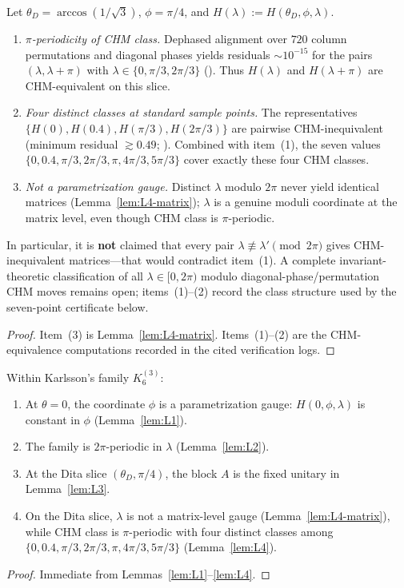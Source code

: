 \begin{lemma}
\label{lem:L4}
\label{lem:dita-chm-pi}
Let $\theta_D=\arccos(1/\sqrt3)$, $\phi=\pi/4$, and $H(\lambda):=H(\theta_D,\phi,\lambda)$.
\begin{enumerate}
    \item \emph{$\pi$-periodicity of CHM class.} Dephased alignment over $720$ column permutations and diagonal phases yields residuals $\sim10^{-15}$ for the pairs $(\lambda,\lambda+\pi)$ with $\lambda\in\{0,\pi/3,2\pi/3\}$ ().
    Thus $H(\lambda)$ and $H(\lambda+\pi)$ are CHM-equivalent on this slice.
    \item \emph{Four distinct classes at standard sample points.} The representatives $\{H(0),H(0.4),H(\pi/3),H(2\pi/3)\}$ are pairwise CHM-inequivalent (minimum residual $\gtrsim0.49$; ).
    Combined with item~(1), the seven values $\{0,0.4,\pi/3,2\pi/3,\pi,4\pi/3,5\pi/3\}$ cover exactly these four CHM classes.
    \item \emph{Not a parametrization gauge.} Distinct $\lambda$ modulo $2\pi$ never yield identical matrices (Lemma~\ref{lem:L4-matrix}); $\lambda$ is a genuine moduli coordinate at the matrix level, even though CHM class is $\pi$-periodic.
\end{enumerate}
In particular, it is \textbf{not} claimed that every pair $\lambda\not\equiv\lambda'\pmod{2\pi}$ gives CHM-inequivalent matrices---that would contradict item~(1).
A complete invariant-theoretic classification of all $\lambda\in[0,2\pi)$ modulo diagonal-phase/permutation CHM moves remains open; items~(1)--(2) record the class structure used by the seven-point certificate below.
\end{lemma}

\begin{proof}
Item~(3) is Lemma~\ref{lem:L4-matrix}.
Items~(1)--(2) are the CHM-equivalence computations recorded in the cited verification logs.
\end{proof}

\begin{theorem}
\label{thm:T1}
Within Karlsson's family $K_6^{(3)}$:
\begin{enumerate}
    \item At $\theta=0$, the coordinate $\phi$ is a parametrization gauge: $H(0,\phi,\lambda)$ is constant in $\phi$ (Lemma~\ref{lem:L1}).
    \item The family is $2\pi$-periodic in $\lambda$ (Lemma~\ref{lem:L2}).
    \item At the Dita slice $(\theta_D,\pi/4)$, the block $A$ is the fixed unitary in Lemma~\ref{lem:L3}.
    \item On the Dita slice, $\lambda$ is not a matrix-level gauge (Lemma~\ref{lem:L4-matrix}), while CHM class is $\pi$-periodic with four distinct classes among $\{0,0.4,\pi/3,2\pi/3,\pi,4\pi/3,5\pi/3\}$ (Lemma~\ref{lem:L4}).
\end{enumerate}
\end{theorem}

\begin{proof}
Immediate from Lemmas~\ref{lem:L1}--\ref{lem:L4}.
\end{proof}
